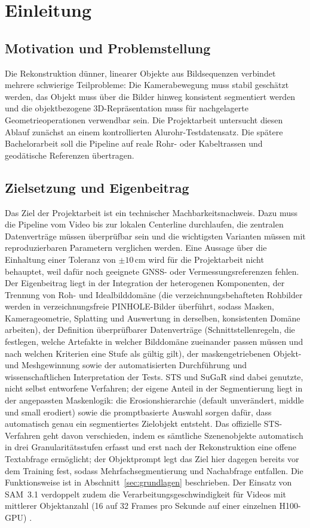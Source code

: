 \section{Einleitung}

\subsection{Motivation und Problemstellung}

Die Rekonstruktion dünner, linearer Objekte aus Bildsequenzen verbindet mehrere
schwierige Teilprobleme: Die Kamerabewegung muss stabil geschätzt werden, das
Objekt muss über die Bilder hinweg konsistent segmentiert werden und die
objektbezogene 3D-Repräsentation muss für nachgelagerte Geometrieoperationen
verwendbar sein. Die Projektarbeit untersucht diesen Ablauf zunächst an einem
kontrollierten Alurohr-Testdatensatz. Die spätere Bachelorarbeit soll die
Pipeline auf reale Rohr- oder Kabeltrassen und geodätische Referenzen
übertragen.

\subsection{Zielsetzung und Eigenbeitrag}

Das Ziel der Projektarbeit ist ein technischer Machbarkeitsnachweis. Dazu muss
die Pipeline vom Video bis zur lokalen Centerline durchlaufen, die zentralen
Datenverträge müssen überprüfbar sein und die wichtigsten Varianten müssen mit
reproduzierbaren Parametern verglichen werden. Eine Aussage über die Einhaltung
einer Toleranz von \(\pm 10\,\mathrm{cm}\) wird für die Projektarbeit nicht
behauptet, weil dafür noch geeignete GNSS- oder Vermessungsreferenzen fehlen.
Der Eigenbeitrag liegt in der Integration der heterogenen Komponenten, der
Trennung von Roh- und Idealbilddomäne (die verzeichnungsbehafteten Rohbilder
werden in verzeichnungsfreie PINHOLE-Bilder überführt, sodass Masken,
Kamerageometrie, Splatting und Auswertung in derselben, konsistenten Domäne
arbeiten), der Definition überprüfbarer Datenverträge (Schnittstellenregeln,
die festlegen, welche Artefakte in welcher Bilddomäne zueinander passen
müssen und nach welchen Kriterien eine Stufe als gültig gilt), der
maskengetriebenen Objekt- und Meshgewinnung sowie der automatisierten
Durchführung und wissenschaftlichen Interpretation der Tests. STS und SuGaR
sind dabei genutzte, nicht selbst entworfene Verfahren; der eigene Anteil in
der Segmentierung liegt in der angepassten Maskenlogik: die Erosionshierarchie
(default unverändert, middle und small erodiert) sowie die promptbasierte
Auswahl sorgen dafür, dass automatisch genau ein
segmentiertes Zielobjekt entsteht. Das offizielle STS-Verfahren geht davon
verschieden, indem es sämtliche Szenenobjekte automatisch in drei
Granularitätsstufen erfasst und erst nach der Rekonstruktion eine offene
Textabfrage ermöglicht; der Objektprompt legt das Ziel hier dagegen bereits
vor dem Training fest, sodass Mehrfachsegmentierung und Nachabfrage
entfallen. Die Funktionsweise ist in
Abschnitt~\ref{sec:grundlagen} beschrieben.
Der Einsatz von SAM~3.1 verdoppelt zudem die Verarbeitungsgeschwindigkeit für
Videos mit mittlerer Objektanzahl (16 auf 32 Frames pro Sekunde auf einer
einzelnen H100-GPU) \parencite{metaSam3}.

